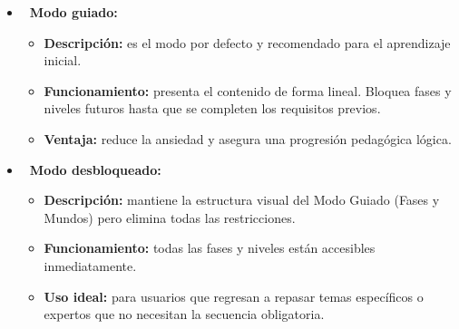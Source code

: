 \begin{itemize}
\item \textbf{\faMap\ Modo guiado:}
\begin{itemize}
\item \textbf{Descripción:} es el modo por defecto y recomendado para el aprendizaje inicial.
\item \textbf{Funcionamiento:} presenta el contenido de forma lineal. Bloquea fases y niveles futuros hasta que se completen los requisitos previos.
\item \textbf{Ventaja:} reduce la ansiedad y asegura una progresión pedagógica lógica.
\end{itemize}
\end{itemize}
\begin{itemize}
\item \textbf{\faUnlock\ Modo desbloqueado:}
\begin{itemize}
\item \textbf{Descripción:} mantiene la estructura visual del Modo Guiado (Fases y Mundos) pero elimina todas las restricciones.
\item \textbf{Funcionamiento:} todas las fases y niveles están accesibles inmediatamente.
\item \textbf{Uso ideal:} para usuarios que regresan a repasar temas específicos o expertos que no necesitan la secuencia obligatoria.
\end{itemize}
\end{itemize}
